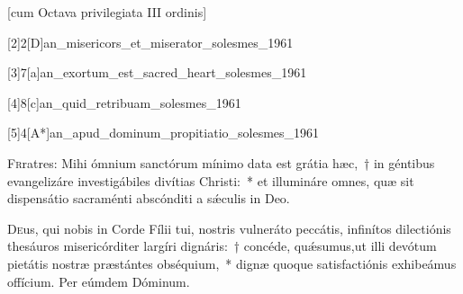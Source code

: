 \documentclass[vesperale_romanum.tex]{subfiles}
\begin{document}
 [cum Octava privilegiata III ordinis]
 \thispagestyle{empty}

  \label{i_vesperis_sc}
\zerobaroffsettextleft
 \resetbaroffsettextleft
{}
 
 [2]{2}[D]{an_misericors_et_miserator_solesmes_1961}
 
 
 
 
  [3]{7}[a]{an_exortum_est_sacred_heart_solesmes_1961}
  
   [4]{8}[c]{an_quid_retribuam_solesmes_1961}
   
    [5]{4}[A*]{an_apud_dominum_propitiatio_solesmes_1961}
    
    \label{cap_sc}
{}

\lettrine{F}{r}ratres: Mihi ómnium sanctórum mínimo data est grátia hæc,~† in géntibus evangelizáre investigábiles divítias Christi:~* et illumináre omnes, quæ sit dispensátio sacraménti abscónditi a sǽculis in Deo.

\hymnus \label{hy_en_ut_superba}
   
   
   \label{Tollite}
   
    
 \label{Ignem}
 
\oratio \label{oratio_sc}

\lettrine{D}{e}us, qui nobis in Corde Fílii tui, nostris vulneráto peccátis, infinítos dilectiónis thesáuros misericórditer largíri dignáris:~† concéde, quǽsumus,ut illi devótum pietátis nostræ præstántes obséquium,~* dignæ quoque satisfactiónis exhibeámus offícium. Per eúmdem Dóminum.
 
\end{document}
